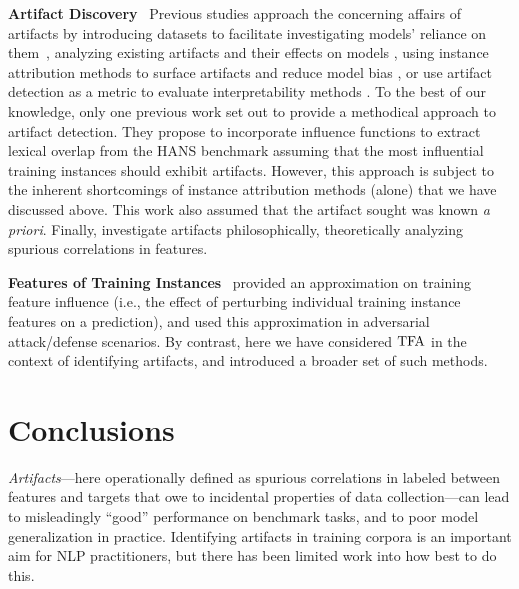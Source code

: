 \documentclass[11pt]{article}
\newcommand\para[1]{\vskip 1mm\noindent\textbf{#1}~}
\begin{document}
\para{Artifact Discovery}
Previous studies approach the concerning affairs of artifacts by introducing datasets to facilitate investigating models' reliance on them~\citep{mccoy2019right}, analyzing existing artifacts and their effects on models \citep{gururangan2018annotation}, using instance attribution methods to surface artifacts and reduce model bias \citep{han2021influence,zylberajch2021hildif}, or use artifact detection as a metric to evaluate interpretability methods \citep{ross2020explaining}. 
To the best of our knowledge, only one previous work \citep{han2020explaining} set out to provide a methodical approach to artifact detection. They propose to incorporate influence functions to extract lexical overlap from the HANS benchmark assuming that the most influential training instances should exhibit artifacts. 
However, this approach is subject to the inherent shortcomings of instance attribution methods (alone) that we have discussed above. 
This work also assumed that the artifact sought was known \emph{a priori}.
Finally, \citet{gardner2021competency} investigate artifacts philosophically, theoretically analyzing spurious correlations in features.  

\para{Features of Training Instances} \citet{koh2017understanding} provided an approximation on training feature influence (i.e., the effect of perturbing individual training instance features on a prediction), %
and used this approximation in adversarial attack/defense scenarios. 
By contrast, here we have considered $\text{TFA}$ in the context of identifying artifacts, and introduced a broader set of such methods. %



\section{Conclusions}%
\vspace{-.5em}
\emph{Artifacts}---here operationally defined as spurious correlations  %
in labeled between features and targets that owe to incidental properties of data collection---can lead to misleadingly ``good'' performance on benchmark tasks, and to poor model generalization in practice.
Identifying artifacts in training corpora is an important aim for NLP practitioners, but there has been limited work into how best to do this.
\end{document}
